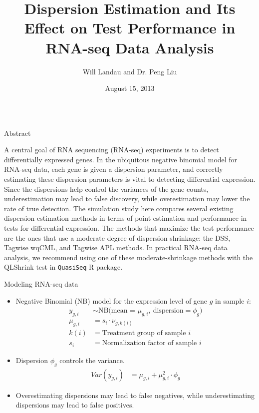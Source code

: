 \documentclass{beamer}
\title{\Huge Dispersion Estimation and Its Effect on Test Performance in RNA-seq Data Analysis}
\author{Will Landau and Dr. Peng Liu}
\institute[Iowa State University]
{Iowa State University, Ames, IA, USA}
\date[August 5, 2013]{August 15, 2013}
\begin{document}
\begin{frame} 
\begin{columns}[t]

\begin{column}{.33\linewidth}


\begin{block}{Abstract}
\begin{flushleft}
\hspace{1cm} A central goal of RNA sequencing (RNA-seq) experiments is to detect differentially expressed genes. In the ubiquitous negative binomial model for RNA-seq data, each gene is given a dispersion parameter, and correctly estimating these dispersion parameters is vital to detecting differential expression. Since the dispersions help control the variances of the gene counts, underestimation may lead to false discovery, while overestimation may lower the rate of true detection. The simulation study here compares several existing dispersion estimation methods in terms of point estimation and performance in tests for differential expression. The methods that maximize the test performance are the ones that use a moderate degree of dispersion shrinkage: the DSS, Tagwise wqCML, and Tagwise APL methods. In practical RNA-seq data analysis, we recommend using one of these moderate-shrinkage methods with the QLShrink test in {\tt QuasiSeq} R package.
\end{flushleft}
\end{block}


    
\begin{block}{Modeling RNA-seq data}

\begin{itemize}
\item Negative Binomial (NB) model for the expression level of gene $g$ in sample $i$:
\begin{align*}
y_{g, i} &\sim \text{NB(mean = } \mu_{g, i}, \ \text{dispersion} = \phi_g)  \\
\mu_{g, i} &= s_i \cdot \nu_{g, k(i)} \\
k(i) &= \text{Treatment group of sample $i$} \\
s_i &= \text{Normalization factor of sample $i$} 
\end{align*}
\item Dispersion $\phi_g$ controls the variance.
\begin{align*}
Var(y_{g,i}) &= \mu_{g, i} + \mu_{g, i}^2 \cdot \phi_g 
\end{align*}
\item Overestimating dispersions may lead to false negatives, while underestimating dispersions may lead to false positives.
\end{itemize}
\end{block}
    

\end{column}
\end{columns}
\end{frame}
\end{document}
